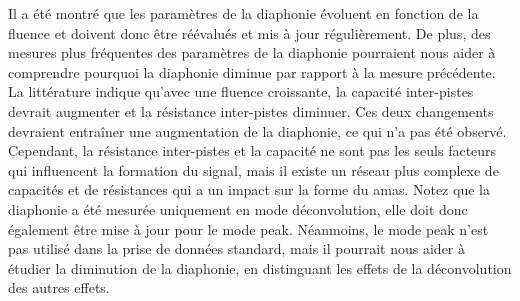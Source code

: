 
Il a été montré que les paramètres de la diaphonie évoluent en fonction de la fluence et doivent donc être réévalués et mis à jour régulièrement. De plus, des mesures plus fréquentes des paramètres de la diaphonie pourraient nous aider à comprendre pourquoi la diaphonie diminue par rapport à la mesure précédente. La littérature indique qu'avec une fluence croissante, la capacité inter-pistes devrait augmenter et la résistance inter-pistes diminuer. Ces deux changements devraient entraîner une augmentation de la diaphonie, ce qui n’a pas été observé. Cependant, la résistance inter-pistes et la capacité ne sont pas les seuls facteurs qui influencent la formation du signal, mais il existe un réseau plus complexe de capacités et de résistances qui a un impact sur la forme du amas. Notez que la diaphonie a été mesurée uniquement en mode déconvolution, elle doit donc également être mise à jour pour le mode peak. Néanmoins, le mode peak n'est pas utilisé dans la prise de données standard, mais il pourrait nous aider à étudier la diminution de la diaphonie, en distinguant les effets de la déconvolution des autres effets.


